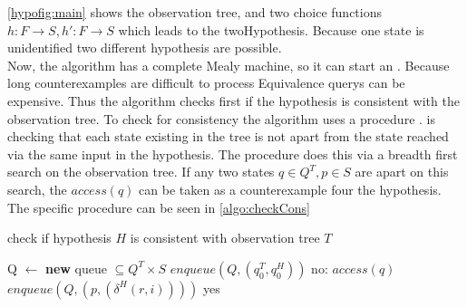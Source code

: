 \autoref{hypofig:main} shows the observation tree, and two choice functions $h:F\rightarrow S, h':F\rightarrow S$ which leads to the twoHypothesis. Because one state is unidentified two different hypothesis are possible.\\ 
Now, the algorithm has a complete Mealy machine, so it can start an \equery. Because long counterexamples are difficult to process Equivalence querys can be expensive. Thus the algorithm checks first if the hypothesis is consistent with the observation tree. To check for consistency the algorithm uses a procedure \chcons. \chcons \space is checking that each state existing in the tree is not apart from the state reached via the same input in the hypothesis. The procedure does this via a breadth first search on the observation tree. If any two states $q\in Q^T, p \in S$ are apart on this search, the $access(q)$ can be taken as a counterexample four the hypothesis. The specific procedure can be seen in \autoref{algo:checkCons}
\begin{algorithm}[b]
	\caption{check if hypothesis $H$ is consistent with observation tree $T$}
	\label{algo:checkCons}
	\begin{algorithmic}
		\State Q $\gets$ \textbf{new} queue $\subseteq Q^T \times S$
		 \State $enqueue(Q,(q_0^T,q_0^H))$
		 	\Return no: $access(q)$
		 	\EndIf
		 	\State $enqueue(Q,(p,(\delta^H(r,i))))$
		 	\EndFor
		 \EndWhile
		 \Return yes
		 \EndProcedure
	\end{algorithmic}
\end{algorithm}

